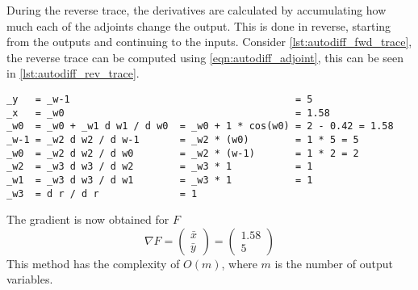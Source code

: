 During the reverse trace, the derivatives are calculated by accumulating how much each of the adjoints change the output.
This is done in reverse, starting from the outputs and continuing to the inputs.
Consider \autoref{lst:autodiff_fwd_trace}, the reverse trace can be computed using \autoref{eqn:autodiff_adjoint}, this can be seen in \autoref{lst:autodiff_rev_trace}.
\begin{lstlisting}[label={lst:autodiff_rev_trace}, caption={Reverse trace of \autoref{lst:autodiff_fwd_trace}, with $x=5$ and $y=2$. The reverse trace is calculated from bottom to top. \texttt{\_} before a variable means that it is it's adjoint.}]
_y   = _w-1                                       = 5
_x   = _w0                                        = 1.58
_w0  = _w0 + _w1 d w1 / d w0  = _w0 + 1 * cos(w0) = 2 - 0.42 = 1.58
_w-1 = _w2 d w2 / d w-1       = _w2 * (w0)        = 1 * 5 = 5
_w0  = _w2 d w2 / d w0        = _w2 * (w-1)       = 1 * 2 = 2
_w2  = _w3 d w3 / d w2        = _w3 * 1           = 1
_w1  = _w3 d w3 / d w1        = _w3 * 1           = 1
_w3  = d r / d r              = 1
\end{lstlisting}
The gradient is now obtained for $F$
$$\nabla F = \left( \begin{array}{c}
    \bar{x}\\
    \bar{y}
\end{array} \right) = \left( \begin{array}{c}
    1.58\\
    5
\end{array} \right)$$
This method has the complexity of $O(m)$, where $m$ is the number of output variables.
